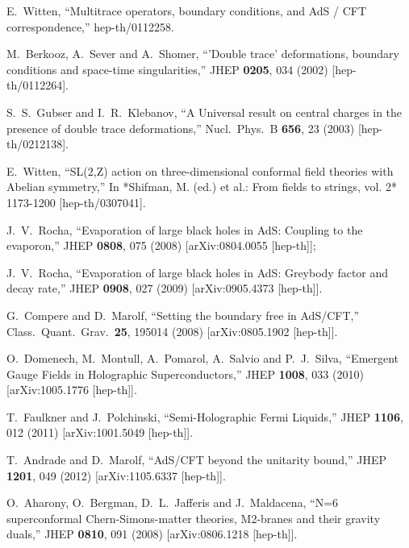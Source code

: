\documentclass[12pt]{article}
\begin{document}
{\begin{thebibliography}{99}
  E.~Witten,
  ``Multitrace operators, boundary conditions, and AdS / CFT correspondence,''
  hep-th/0112258.


  M.~Berkooz, A.~Sever and A.~Shomer,
  ``'Double trace' deformations, boundary conditions and space-time singularities,''
  JHEP {\bf 0205}, 034 (2002)
  [hep-th/0112264].


  S.~S.~Gubser and I.~R.~Klebanov,
  ``A Universal result on central charges in the presence of double trace deformations,''
  Nucl.\ Phys.\ B {\bf 656}, 23 (2003)
  [hep-th/0212138].


  E.~Witten,
  ``SL(2,Z) action on three-dimensional conformal field theories with Abelian symmetry,''
  In *Shifman, M. (ed.) et al.: From fields to strings, vol. 2* 1173-1200
  [hep-th/0307041].

  J.~V.~Rocha,
  ``Evaporation of large black holes in AdS: Coupling to the evaporon,''
  JHEP {\bf 0808}, 075 (2008)
  [arXiv:0804.0055 [hep-th]];

 J.~V.~Rocha,
  ``Evaporation of large black holes in AdS: Greybody factor and decay rate,''
  JHEP {\bf 0908}, 027 (2009)
  [arXiv:0905.4373 [hep-th]].


  G.~Compere and D.~Marolf,
  ``Setting the boundary free in AdS/CFT,''
  Class.\ Quant.\ Grav.\  {\bf 25}, 195014 (2008)
  [arXiv:0805.1902 [hep-th]].

  O.~Domenech, M.~Montull, A.~Pomarol, A.~Salvio and P.~J.~Silva,
  ``Emergent Gauge Fields in Holographic Superconductors,''
  JHEP {\bf 1008}, 033 (2010)
  [arXiv:1005.1776 [hep-th]].

  T.~Faulkner and J.~Polchinski,
  ``Semi-Holographic Fermi Liquids,''
  JHEP {\bf 1106}, 012 (2011)
  [arXiv:1001.5049 [hep-th]].

  T.~Andrade and D.~Marolf,
  ``AdS/CFT beyond the unitarity bound,''
  JHEP {\bf 1201}, 049 (2012)
  [arXiv:1105.6337 [hep-th]].


  O.~Aharony, O.~Bergman, D.~L.~Jafferis and J.~Maldacena,
  ``N=6 superconformal Chern-Simons-matter theories, M2-branes and their gravity duals,''
  JHEP {\bf 0810}, 091 (2008)
  [arXiv:0806.1218 [hep-th]].


\end{thebibliography}}
\end{document}
